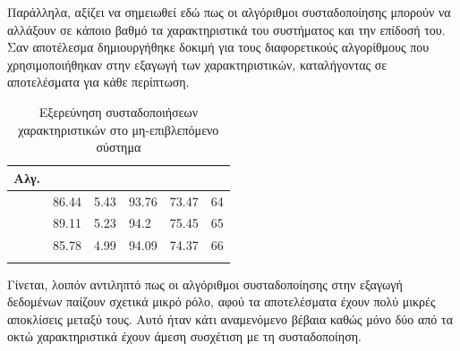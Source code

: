 Παράλληλα, αξίζει να σημειωθεί εδώ πως οι αλγόριθμοι συσταδοποίησης μπορούν να αλλάξουν σε κάποιο βαθμό τα χαρακτηριστικά του συστήματος και την επίδοσή του. Σαν αποτέλεσμα δημιουργήθηκε δοκιμή για τους διαφορετικούς αλγορίθμους που χρησιμοποιήθηκαν στην εξαγωγή των χαρακτηριστικών, καταλήγοντας σε αποτελέσματα για κάθε περίπτωση.
\begin{center}
\begin{longtabu} to 0.8\textwidth { | X[c] || X[c] | X[c] | X[c] | X[c] | X[c] |  }
 \hline
 Αλγ.&   &  &  &  & \\
\hline
  & 86.44	&	5.43 &	93.76 &	73.47 &	64\\
\hline
 & 89.11	&	5.23 &	94.2 &	75.45 &	65\\ 
 \hline
   & 85.78	&	4.99 &	94.09 &	74.37 &	66\\
\hline
\caption{Εξερεύνηση συσταδοποιήσεων χαρακτηριστικών στο μη-επιβλεπόμενο σύστημα}
\label{tab:testclusterunsup}
\end{longtabu}
\end{center}
\par Γίνεται, λοιπόν αντιληπτό πως οι αλγόριθμοι συσταδοποίησης στην εξαγωγή δεδομένων παίζουν σχετικά μικρό ρόλο, αφού τα αποτελέσματα έχουν πολύ μικρές αποκλίσεις μεταξύ τους. Αυτό ήταν κάτι αναμενόμενο βέβαια καθώς μόνο δύο από τα οκτώ χαρακτηριστικά έχουν άμεση συσχέτιση με τη συσταδοποίηση.\par
